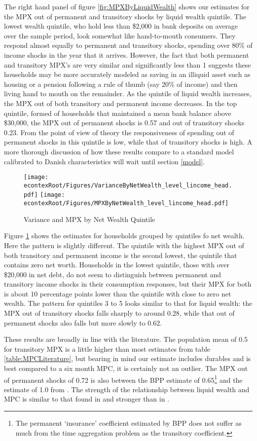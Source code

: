 \documentclass[titlepage]{\econtex}\newcommand{\texname}{ConsumptionHeterogeneity}
\begin{document}
The right hand panel of figure \ref{fig:MPXByLiquidWealth} shows our estimates for the MPX out of permanent and transitory shocks by liquid wealth quintile. The lowest wealth quintile, who hold less than \$2,000 in bank deposits on average over the sample period, look somewhat like hand-to-mouth consumers. They respond almost equally to permanent and transitory shocks, spending over 80\% of income shocks in the year that it arrives. However, the fact that both permanent and transitory MPX's are very similar and significantly less than 1 suggests these households may be more accurately modeled as saving in an illiquid asset such as housing or a pension following a rule of thumb (say 20\% of income) and then living hand to mouth on the remainder. As the quintile of liquid wealth increases, the MPX out of both transitory and permanent income decreases. In the top quintile, formed of households that maintained a mean bank balance above \$30,000, the MPX out of permanent shocks is 0.57 and out of transitory shocks 0.23. From the point of view of theory the responsiveness of spending out of permanent shocks in this quintile is low, while that of transitory shocks is high. A more thorough discussion of how these results compare to a standard model calibrated to Danish characteristics will wait until section \ref{model}.
\begin{figure}
	\centering
	\texttt{[image: \\econtexRoot/Figures/VarianceByNetWealth\_level\_lincome\_head.pdf]}
	\centering
	\texttt{[image: \\econtexRoot/Figures/MPXByNetWealth\_level\_lincome\_head.pdf]}
	\caption{Variance and MPX by Net Wealth Quintile}
	\label{fig:MPXByNetWealth}
\end{figure}

Figure \ref{fig:MPXByNetWealth} shows the estimates for households grouped by quintiles fo net wealth. Here the pattern is slightly different. The quintile with the highest MPX out of both transitory and permanent income is the second lowest, the quintile that contains zero net worth. Households in the lowest quintile, those with over \$20,000 in net debt, do not seem to distinguish between permanent and transitory income shocks in their consumption responses, but their MPX for both is about 10 percentage points lower than the quintile with close to zero net wealth. The pattern for quintiles 3 to 5 looks similar to that for liquid wealth: the MPX out of transitory shocks falls sharply to around 0.28, while that out of permanent shocks also falls but more slowly to 0.62.

These results are broadly in line with the literature. The population mean of 0.5 for transitory MPX is a little higher than most estimates from table \ref{table:MPCLiterature}, but bearing in mind our estimate includes durables and is best compared to a six month MPC, it is certainly not an outlier. The MPX out of permanent shocks of 0.72 is also between the BPP estimate of 0.65\footnote{The permanent `insurance' coefficient estimated by BPP does not suffer as much from the time aggregation problem as the transitory coefficient.} and the estimate of 1.0 from \cite{gelman_response_2016}. The strength of the relationship between liquid wealth and MPC is similar to that found in \cite{gelman_what_2016} and stronger than in \cite{fagereng_mpc_2016}.
\end{document}
